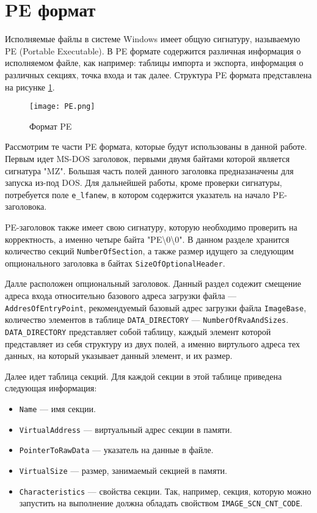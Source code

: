 
\section{PE формат}
Исполняемые файлы в системе Windows имеет общую сигнатуру, называемую
PE (Portable Executable). В PE формате содержится различная информация о
исполняемом файле, как например: таблицы импорта и экспорта, информация о
различных секциях, точка входа и так далее. Структура PE формата представлена на
рисунке \ref{fig:PE}.
\begin{figure}[htb]
  \centering
  \texttt{[image: PE.png]}
  \caption{Формат PE}
  \label{fig:PE}
\end{figure}

Рассмотрим те части PE формата, которые будут использованы в данной работе.
Первым идет MS-DOS заголовок, первыми двумя байтами которой является сигнатура
"MZ". Большая часть полей данного заголовка предназаначены для запуска из-под
DOS. Для дальнейшей работы, кроме проверки сигнатуры, потребуется поле
\verb!e_lfanew!, в котором содержится указатель на начало PE-заголовока.

PE-заголовок также имеет свою сигнатуру, которую необходимо проверить на
корректность, а именно четыре байта "PE\textbackslash0\textbackslash0". В данном
разделе хранится количество секций \verb!NumberOfSection!, а также размер
идущего за следующим опционального заголовка в байтах
\verb!SizeOfOptionalHeader!.

Далле расположен опциональный заголовок. Данный раздел содежит смещение адреса
входа относительно базового адреса загрузки файла --- \texttt{AddresOfEntryPoint},
рекомендуемый базовый адрес загрузки файла \verb!ImageBase!, количество
элементов в таблице \verb!DATA_DIRECTORY! --- \verb!NumberOfRvaAndSizes!.
\verb!DATA_DIRECTORY! представляет собой таблицу, каждый элемент которой
представляет из себя структуру из двух полей, а именно виртулього адреса тех
данных, на который указывает данный элемент, и их размер. 

Далее идет таблица секций. Для каждой секции в этой таблице приведена следующая
информация:
\begin{itemize}
  \item \verb!Name! --- имя секции. 
  \item \verb!VirtualAddress! --- виртуальный адрес секции в памяти.
  \item \verb!PointerToRawData! --- указатель на данные в файле.
  \item \verb!VirtualSize! --- размер, занимаемый секцией в памяти.
  \item \verb!Characteristics! --- свойства секции. Так, например, секция,
    которую можно запустить на выполнение должна обладать свойством
    \verb!IMAGE_SCN_CNT_CODE!.
\end{itemize}

